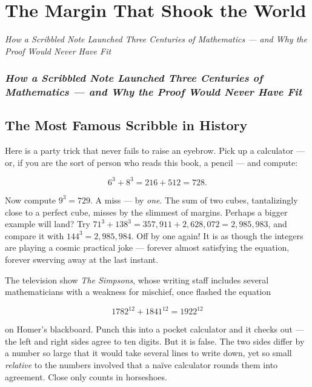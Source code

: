 \chapter{The Margin That Shook the World}

\begin{center}\textit{How a Scribbled Note Launched Three Centuries of Mathematics --- and Why the Proof Would Never Have Fit}\end{center}
\bigskip

\subsection*{\textit{How a Scribbled Note Launched Three Centuries of Mathematics --- and Why the Proof Would Never Have Fit}}

\bigskip

\section*{The Most Famous Scribble in History}

Here is a party trick that never fails to raise an eyebrow. Pick up a calculator --- or, if you are the sort of person who reads this book, a pencil --- and compute:

\[
6^3 + 8^3 = 216 + 512 = 728.
\]

Now compute $9^3 = 729$. A miss --- by \textit{one}. The sum of two cubes, tantalizingly close to a perfect cube, misses by the slimmest of margins. Perhaps a bigger example will land? Try $71^3 + 138^3 = 357{,}911 + 2{,}628{,}072 = 2{,}985{,}983$, and compare it with $144^3 = 2{,}985{,}984$. Off by one again! It is as though the integers are playing a cosmic practical joke --- forever almost satisfying the equation, forever swerving away at the last instant.

The television show \textit{The Simpsons}, whose writing staff includes several mathematicians with a weakness for mischief, once flashed the equation

\[
1782^{12} + 1841^{12} = 1922^{12}
\]

on Homer's blackboard. Punch this into a pocket calculator and it checks out --- the left and right sides agree to ten digits. But it is false. The two sides differ by a number so large that it would take several lines to write down, yet so small \textit{relative} to the numbers involved that a na\"ive calculator rounds them into agreement. Close only counts in horseshoes.


